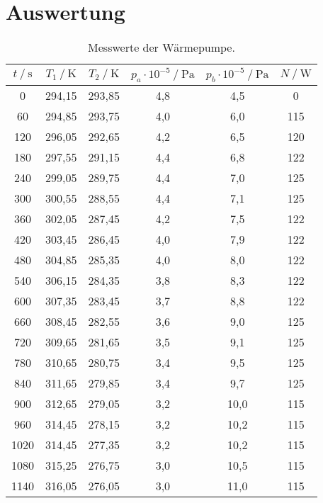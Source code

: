\section{Auswertung}
\label{sec:Auswertung}

\begin{table}[H]
	\centering
	\caption{Messwerte der Wärmepumpe.}
	\label{tab:Tab1}
	\begin{tabular}{S[table-format=4.0] S S S[table-format=1.1] S[table-format=2.1] S[table-format=3.0]}
		\toprule
      {$t \mathbin{/} \si{\second}$}&{$T_1 \mathbin{/} \si{\kelvin}$}&{$T_2 \mathbin{/} \si{\kelvin}$}&{$p_a \cdot 10^{-5} \mathbin{/} \si{\pascal}$}&{$p_b \cdot 10^{-5} \mathbin{/} \si{\pascal}$} &
      {$N \mathbin{/} \si{\watt}$}\\
     & 294,15 & 293,85 & 4,8 & 4,5 & 0\\
      60 & 294,85 & 293,75 & 4,0 & 6,0 & 115\\
      120 & 296,05 & 292,65 & 4,2 & 6,5 & 120\\
      180 & 297,55 & 291,15 & 4,4 & 6,8 & 122\\
      240 & 299,05 & 289,75 & 4,4 & 7,0 & 125\\
      300 & 300,55 & 288,55 & 4,4 & 7,1 & 125\\
      360 & 302,05 & 287,45 & 4,2 & 7,5 & 122\\
      420 & 303,45 & 286,45 & 4,0 & 7,9 & 122\\
      480 & 304,85 & 285,35 & 4,0 & 8,0 & 122\\
      540 & 306,15 & 284,35 & 3,8 & 8,3 & 122\\
      600 & 307,35 & 283,45 & 3,7 & 8,8 & 122\\
      660 & 308,45 & 282,55 & 3,6 & 9,0 & 125\\
      720 & 309,65 & 281,65 & 3,5 & 9,1 & 125\\
      780 & 310,65 & 280,75 & 3,4 & 9,5 & 125\\
      840 & 311,65 & 279,85 & 3,4 & 9,7 & 125\\
      900 & 312,65 & 279,05 & 3,2 & 10,0 & 115\\
      960 & 314,45 & 278,15 & 3,2 & 10,2 & 115\\
      1020 & 314,45 & 277,35 & 3,2 & 10,2 & 115\\
      1080 & 315,25 & 276,75 & 3,0 & 10,5 & 115\\
      1140 & 316,05 & 276,05 & 3,0 & 11,0 & 115\\

\end{tabular}
\end{table}
